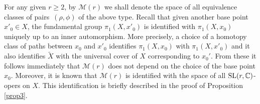 \documentclass[pdftex]{sigma}
\numberwithin{equation}{section}
\begin{document}
For any given $r \geq 2$, by ${\mathcal M}(r)$ we shall denote the space of all equivalence
classes of pairs~$(\rho, \phi)$ of the above type.
Recall that given another base point
$x'_0 \in X$, the fundamental group $\pi_1(X, x'_0)$ is identified with
$\pi_1(X, x_0)$ uniquely up to an inner automorphism. More precisely, a choice of
a homotopy class of paths between $x_0$ and $x'_0$ identifies $\pi_1(X, x_0)$
with $\pi_1(X, x'_0)$ and it also identifies $\widetilde{X}$ with the universal cover of $X$
corresponding to $x_0'$. From these it follows immediately
that ${\mathcal M}(r)$ does not depend on the choice of the base point $x_0$.
Moreover, it is known that ${\mathcal M}(r)$ is identified with the space of all ${\rm SL}(r,
{\mathbb C})$-opers on $X$. This identification is briefly described in the proof
of Proposition \ref{prop3}.
\end{document}
